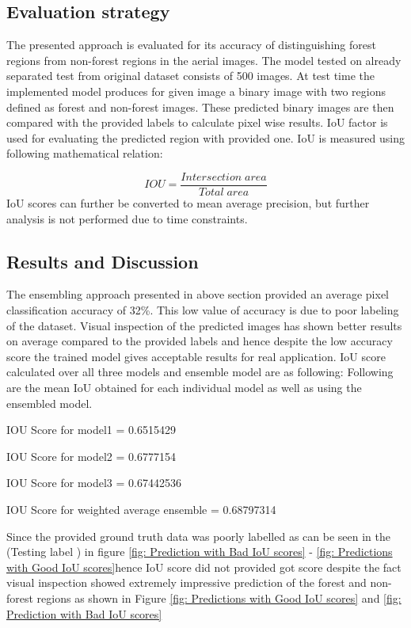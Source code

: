 \documentclass[rnd]{mas_proposal}
\begin{document}
\subsection{Evaluation strategy}



The presented approach is evaluated for its accuracy of distinguishing forest regions from non-forest regions in the aerial images. The model tested on already separated test from original dataset consists of 500 images. At test time the implemented model produces for given image a binary image with two regions defined as forest and non-forest images. These predicted binary images are then compared with the provided labels to calculate pixel wise results. IoU factor is used for evaluating the predicted region with provided one. 
IoU is measured using following mathematical relation:

$$IOU=\frac{Intersection\;area}{Total\;area }$$
IoU scores can further be converted to mean average precision, but further analysis is not performed due to time constraints. 


\subsection{Results and Discussion}

The ensembling approach presented in above section provided an average pixel classification accuracy of 32\%. This low value of accuracy is due to poor 
labeling of the dataset. Visual inspection of the predicted images has shown better results on average compared to the provided labels and hence despite the 
low accuracy score the trained model gives acceptable results for real application. IoU score calculated over all 
three models and ensemble model are as following:
Following are the mean IoU obtained for each individual model as well as using the ensembled model.
\vspace{10px}

IOU Score for model1 =  0.6515429

\vspace{3px}

IOU Score for model2 =  0.6777154

\vspace{3px}
IOU Score for model3 =  0.67442536

\vspace{3px}

IOU Score for weighted average ensemble =  0.68797314 

\vspace{3px}
Since the provided ground truth data was poorly labelled as can be seen in the (Testing label ) in figure \ref{fig: Prediction with Bad IoU scores} - \ref{fig: Predictions with Good  IoU scores}hence IoU score did not provided got score 
despite the fact visual inspection showed extremely impressive prediction of the forest and non-forest regions as shown in 
Figure \ref{fig: Predictions with Good IoU scores} and \ref{fig: Prediction with Bad IoU scores}
\end{document}
